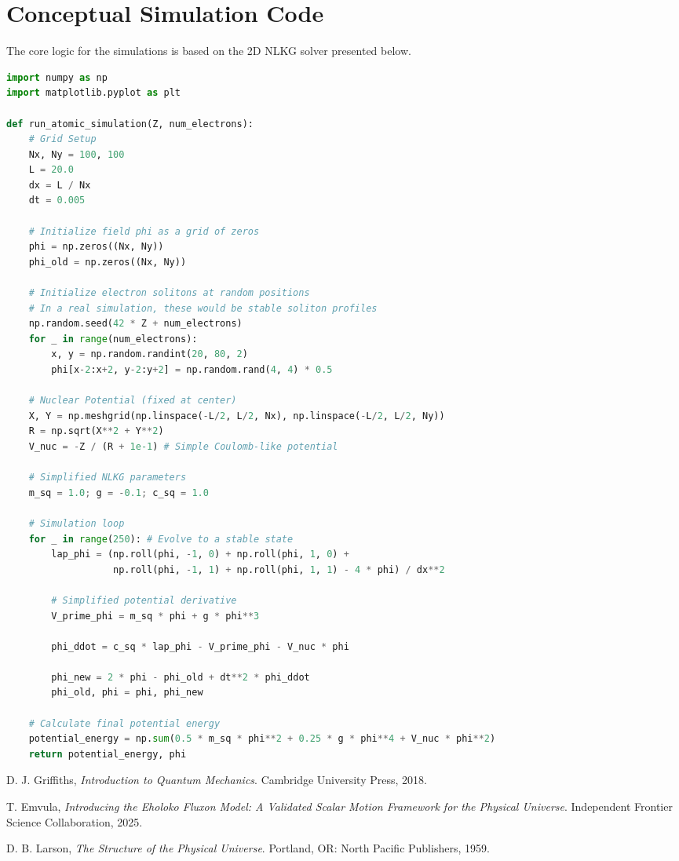 \documentclass[11pt]{article}
\begin{document}
\appendix
\section{Conceptual Simulation Code}
The core logic for the simulations is based on the 2D NLKG solver presented below.

\begin{lstlisting}[language=Python, caption=Conceptual 2D EFM Atomic Simulation]
import numpy as np
import matplotlib.pyplot as plt

def run_atomic_simulation(Z, num_electrons):
    # Grid Setup
    Nx, Ny = 100, 100
    L = 20.0
    dx = L / Nx
    dt = 0.005
    
    # Initialize field phi as a grid of zeros
    phi = np.zeros((Nx, Ny))
    phi_old = np.zeros((Nx, Ny))

    # Initialize electron solitons at random positions
    # In a real simulation, these would be stable soliton profiles
    np.random.seed(42 * Z + num_electrons)
    for _ in range(num_electrons):
        x, y = np.random.randint(20, 80, 2)
        phi[x-2:x+2, y-2:y+2] = np.random.rand(4, 4) * 0.5
    
    # Nuclear Potential (fixed at center)
    X, Y = np.meshgrid(np.linspace(-L/2, L/2, Nx), np.linspace(-L/2, L/2, Ny))
    R = np.sqrt(X**2 + Y**2)
    V_nuc = -Z / (R + 1e-1) # Simple Coulomb-like potential

    # Simplified NLKG parameters
    m_sq = 1.0; g = -0.1; c_sq = 1.0

    # Simulation loop
    for _ in range(250): # Evolve to a stable state
        lap_phi = (np.roll(phi, -1, 0) + np.roll(phi, 1, 0) +
                   np.roll(phi, -1, 1) + np.roll(phi, 1, 1) - 4 * phi) / dx**2
        
        # Simplified potential derivative
        V_prime_phi = m_sq * phi + g * phi**3

        phi_ddot = c_sq * lap_phi - V_prime_phi - V_nuc * phi
        
        phi_new = 2 * phi - phi_old + dt**2 * phi_ddot
        phi_old, phi = phi, phi_new

    # Calculate final potential energy
    potential_energy = np.sum(0.5 * m_sq * phi**2 + 0.25 * g * phi**4 + V_nuc * phi**2)
    return potential_energy, phi
\end{lstlisting}


\begin{thebibliography}{99}
\raggedright

D. J. Griffiths, \textit{Introduction to Quantum Mechanics}. Cambridge University Press, 2018.

T. Emvula, \textit{Introducing the Eholoko Fluxon Model: A Validated Scalar Motion Framework for the Physical Universe}. Independent Frontier Science Collaboration, 2025.

D. B. Larson, \textit{The Structure of the Physical Universe}. Portland, OR: North Pacific Publishers, 1959.

\end{thebibliography}
\end{document}
